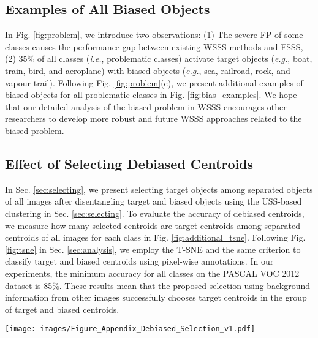 \documentclass[10pt,twocolumn,letterpaper]{article}
\begin{document}
\subsection{Examples of All Biased Objects}





In Fig. \ref{fig:problem}, we introduce two observations: (1) The severe FP of some classes causes the performance gap between existing WSSS methods \cite{wang2020self, jo2022recurseed} and FSSS, (2) 35\% of all classes (\emph{i.e.}, problematic classes) activate target objects (\emph{e.g.}, boat, train, bird, and aeroplane) with biased objects (\emph{e.g.}, sea, railroad, rock, and vapour trail). Following Fig. \ref{fig:problem}(c), we present additional examples of biased objects for all problematic classes in Fig. \ref{fig:bias_examples}. We hope that our detailed analysis of the biased problem in WSSS encourages other researchers to develop more robust and future WSSS approaches related to the biased problem.


\subsection{Effect of Selecting Debiased Centroids}





In Sec. \ref{sec:selecting}, we present selecting target objects among separated objects of all images after disentangling target and biased objects using the USS-based clustering in Sec. \ref{sec:selecting}. To evaluate the accuracy of debiased centroids, we measure how many selected centroids are target centroids among separated centroids of all images for each class in Fig. \ref{fig:additional_tsne}. Following Fig. \ref{fig:tsne} in Sec. \ref{sec:analysis}, we employ the T-SNE \cite{van2008visualizing} and the same criterion to classify target and biased centroids using pixel-wise annotations. In our experiments, the minimum accuracy for all classes on the PASCAL VOC 2012  dataset is 85\%. These results mean that the proposed selection using background information from other images successfully chooses target centroids in the group of target and biased centroids.

\begin{figure*}
  \centering
  \texttt{[image: images/Figure\_Appendix\_Debiased\_Selection\_v1.pdf]}
\caption{
      Visualization of selecting debiased centroids for all classes on the PASCAL VOC 2012  set. Red circles are selected centroids by our method. The average ratio of target centroids is more than 85\%, showing the effectiveness of the proposed selection.
  }
  \label{fig:additional_tsne}
\end{figure*}
\end{document}
